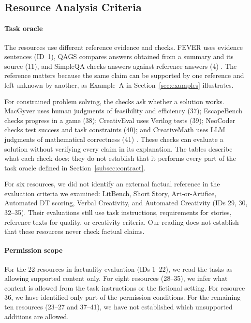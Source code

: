 \subsection{Resource Analysis Criteria}\label{sec:mapping}

\paragraph{Task oracle}
The resources use different reference evidence and checks. FEVER uses
evidence sentences (ID~1), QAGS compares answers obtained from a summary
and its source (11), and SimpleQA checks answers against reference answers
(4) \citep{thorne_fever_2018,wang_asking_2020,wei_measuring_2024}.
The reference matters because the same claim can be supported by one
reference and left unknown by another, as Example~A in
Section~\ref{sec:examples} illustrates.

For constrained problem solving, the checks ask whether a solution works.
MacGyver uses human judgments of feasibility and efficiency (37);
EscapeBench checks progress in a game (38); CreativEval uses Verilog tests
(39); NeoCoder checks test success and task constraints (40); and
CreativeMath uses LLM judgments of mathematical correctness (41)
\citep{tian_macgyver_2025,qian_escapebench_2025,delorenzo_creativeval_2024,
lu_benchmarking_2025,ye_assessing_2025}. These checks can evaluate a solution
without verifying every claim in its explanation. The tables describe
what each check does; they do not establish that it performs every part
of the task oracle defined in Section~\ref{subsec:contract}.

For six resources, we did not identify an external factual reference in the
evaluation criteria we examined: LitBench, Short Story, Art-or-Artifice,
Automated DT scoring, Verbal Creativity, and Automated Creativity
(IDs 29, 30, 32--35). Their evaluations still use task instructions,
requirements for stories, reference texts for quality, or creativity
criteria. Our reading does not establish that these resources never check
factual claims.

\paragraph{Permission scope}
For the 22 resources in factuality evaluation (IDs 1--22), we read the tasks
as allowing supported content only. For eight resources (28--35), we infer
what content is allowed from the task instructions or the fictional setting.
For resource 36, we have identified only part of the permission conditions.
For the remaining ten resources (23--27 and 37--41), we have not established
which unsupported additions are allowed.

